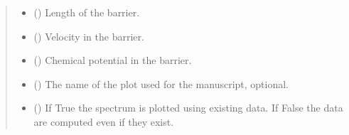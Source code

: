 \documentclass[letterpaper,10pt,english]{sphinxmanual}
\begin{document}
\begin{fulllineitems}
\begin{quote}
\begin{description}
\begin{itemize}
\item {} 
\sphinxAtStartPar
{} () \textendash{} Length of the barrier.

\item {} 
\sphinxAtStartPar
{} () \textendash{} Velocity in the barrier.

\item {} 
\sphinxAtStartPar
{} () \textendash{} Chemical potential in the barrier.

\item {} 
\sphinxAtStartPar
{} () \textendash{} The name of the plot used for the manuscript, optional.

\item {} 
\sphinxAtStartPar
{} () \textendash{} If True the spectrum is plotted using existing data.
If False the data are computed even if they exist.

\end{itemize}

\end{description}\end{quote}

\end{fulllineitems}

\end{document}
